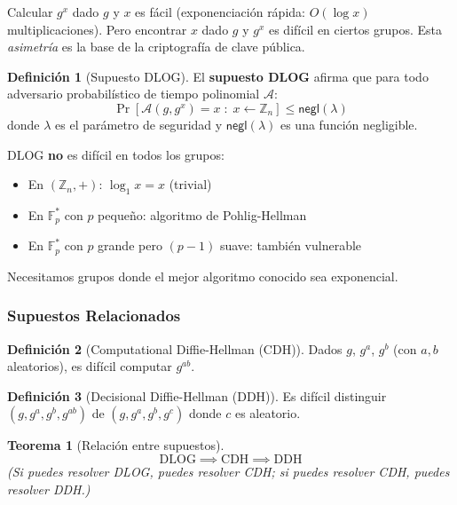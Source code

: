 \documentclass[11pt,a4paper,twoside,openright]{book}
\theoremstyle{definition}
\newtheorem{definition}{Definición}[chapter]
\theoremstyle{plain}
\newtheorem{theorem}{Teorema}[chapter]
\theoremstyle{remark}
\begin{document}
\begin{intuicion}
Calcular $g^x$ dado $g$ y $x$ es fácil (exponenciación rápida: $O(\log x)$ multiplicaciones). Pero encontrar $x$ dado $g$ y $g^x$ es difícil en ciertos grupos. Esta \textit{asimetría} es la base de la criptografía de clave pública.
\end{intuicion}

\begin{definition}[Supuesto DLOG]
El \textbf{supuesto DLOG} afirma que para todo adversario probabilístico de tiempo polinomial $\mathcal{A}$:
\[ \Pr\left[ \mathcal{A}(g, g^x) = x \;:\; x \leftarrow \mathbb{Z}_n \right] \leq \mathsf{negl}(\lambda) \]
donde $\lambda$ es el parámetro de seguridad y $\mathsf{negl}(\lambda)$ es una función negligible.
\end{definition}

\begin{advertencia}
DLOG \textbf{no} es difícil en todos los grupos:
\begin{itemize}
    \item En $(\mathbb{Z}_n, +)$: $\log_1 x = x$ (trivial)
    \item En $\mathbb{F}_p^*$ con $p$ pequeño: algoritmo de Pohlig-Hellman
    \item En $\mathbb{F}_p^*$ con $p$ grande pero $(p-1)$ suave: también vulnerable
\end{itemize}
Necesitamos grupos donde el mejor algoritmo conocido sea exponencial.
\end{advertencia}

\subsubsection{Supuestos Relacionados}

\begin{definition}[Computational Diffie-Hellman (CDH)]
Dados $g$, $g^a$, $g^b$ (con $a, b$ aleatorios), es difícil computar $g^{ab}$.
\end{definition}

\begin{definition}[Decisional Diffie-Hellman (DDH)]
Es difícil distinguir $(g, g^a, g^b, g^{ab})$ de $(g, g^a, g^b, g^c)$ donde $c$ es aleatorio.
\end{definition}

\begin{theorem}[Relación entre supuestos]
\[ \text{DLOG} \implies \text{CDH} \implies \text{DDH} \]
(Si puedes resolver DLOG, puedes resolver CDH; si puedes resolver CDH, puedes resolver DDH.)
\end{theorem}
\end{document}
